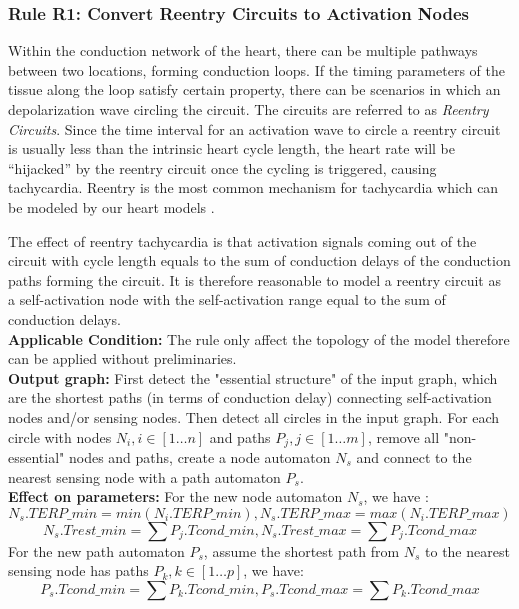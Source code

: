 \subsubsection{Rule R1: Convert Reentry Circuits to Activation Nodes}
Within the conduction network of the heart, there can be multiple pathways between two locations, forming conduction loops. If the timing parameters of the tissue along the loop satisfy certain property, there can be scenarios in which an depolarization wave circling the circuit. The circuits are referred to as \emph{Reentry Circuits}. Since the time interval for an activation wave to circle a reentry circuit is usually less than the intrinsic heart cycle length, the heart rate will be "`hijacked"' by the reentry circuit once the cycling is triggered, causing tachycardia. Reentry is the most common mechanism for tachycardia which can be modeled by our heart models \cite{vhm_embc10}. 

The effect of reentry tachycardia is that activation signals coming out of the circuit with cycle length equals to the sum of conduction delays of the conduction paths forming the circuit. It is therefore reasonable to model a reentry circuit as a self-activation node with the self-activation range equal to the sum of conduction delays. \\
\textbf{Applicable Condition: } The rule only affect the topology of the model therefore can be applied without preliminaries.\\
\textbf{Output graph: }First detect the "essential structure" of the input graph, which are the shortest paths (in terms of conduction delay) connecting self-activation nodes and/or sensing nodes. Then detect all circles in the input graph. For each circle with nodes $N_i,i\in[1\dots n]$ and paths $P_j,j\in[1\dots m]$, remove all "non-essential" nodes and paths, create a node automaton $N_s$ and connect to the nearest sensing node with a path automaton $P_s$.\\
\textbf{Effect on parameters: }For the new node automaton $N_s$, we have :
$$N_s.TERP\_min=min(N_i.TERP\_min), N_s.TERP\_max=max(N_i.TERP\_max)$$
$$N_s.Trest\_min=\sum P_j.Tcond\_min,N_s.Trest\_max=\sum P_j.Tcond\_max$$
For the new path automaton $P_s$, assume the shortest path from $N_s$ to the nearest sensing node has paths $P_k,k\in[1\dots p]$, we have:
$$P_s.Tcond\_min=\sum P_k.Tcond\_min,P_s.Tcond\_max=\sum P_k.Tcond\_max$$
